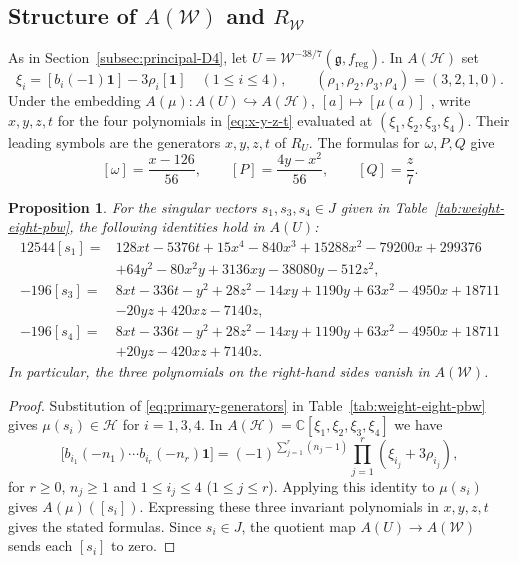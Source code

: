 \documentclass[11pt]{amsart}
\numberwithin{equation}{section}
\newtheorem{proposition}[theorem]{Proposition}
\theoremstyle{definition}
\theoremstyle{remark}
\newcommand{\CC}{\mathbb C}
\newcommand{\g}{\mathfrak g}
\newcommand{\one}{\mathbf1}
\newcommand{\W}{\mathcal W}
\newcommand{\reg}{\mathrm{reg}}
\begin{document}
\subsection{\texorpdfstring{Structure of $A(\mathcal W)$ and $R_{\mathcal W}$}{Structure of A(W) and R(W)}}
\label{sec:Zhu-relations}

As in Section~\ref{subsec:principal-D4}, let $U=\W^{-38/7}(\g,f_{\reg})$.
In $A(\mathcal H)$ set
\[
 \xi_i=[b_i(-1)\one]-3\rho_i[\one]\quad(1\leq i\leq4),
 \qquad (\rho_1,\rho_2,\rho_3,\rho_4)=(3,2,1,0).
\]
Under the embedding $A(\mu):A(U)\hookrightarrow A(\mathcal H)$,
$[a]\mapsto[\mu(a)]$ \cite[Lemma~6.1]{ACL}, write $x,y,z,t$ for
the four polynomials in \eqref{eq:x-y-z-t} evaluated at
$(\xi_1,\xi_2,\xi_3,\xi_4)$. Their leading symbols are the generators
$x,y,z,t$ of $R_U$. The formulas for $\omega,P,Q$ give
\[
 [\omega]=\frac{x-126}{56},\qquad [P]=\frac{4y-x^2}{56},\qquad [Q]=\frac z7.
\]


	
\begin{proposition}\label{prop:classes-singular-vectors}
For the singular vectors $s_1,s_3,s_4\in J$ given in
Table~\ref{tab:weight-eight-pbw}, the following identities hold in $A(U)$:
	\begin{align*}
		12544[s_1]={}&128xt-5376t+15x^4-840x^3
		+15288x^2-79200x+299376\\
		&+64y^2-80x^2y+3136xy-38080y-512z^2,\\[2mm]
		-196[s_3]={}&8xt-336t-y^2+28z^2-14xy
		+1190y+63x^2-4950x+18711\\
		&-20yz+420xz-7140z,\\[2mm]
		-196[s_4]={}&8xt-336t-y^2+28z^2-14xy
		+1190y+63x^2-4950x+18711\\
		&+20yz-420xz+7140z.
	\end{align*}
	In particular, the three polynomials on the right-hand sides vanish
	in $A(\mathcal W)$.
\end{proposition}	
	
\begin{proof}
Substitution of \eqref{eq:primary-generators} in Table~\ref{tab:weight-eight-pbw}
gives $\mu(s_i)\in\mathcal H$ for $i=1,3,4$. In
$A(\mathcal H)=\CC[\xi_1,\xi_2,\xi_3,\xi_4]$ we have
	\[
	\bigl[
	b_{i_1}(-n_1)\cdots b_{i_r}(-n_r)\mathbf1
	\bigr]
	=
	(-1)^{\sum_{j=1}^r(n_j-1)}
    \prod_{j=1}^r(\xi_{i_j}+3\rho_{i_j}),
	\]
for $r\geq0$, $n_j\geq1$ and $1\leq i_j\leq4$ ($1\leq j\leq r$).
Applying this identity to $\mu(s_i)$ gives $A(\mu)([s_i])$. Expressing
these three invariant polynomials in $x,y,z,t$ gives the stated
formulas. Since $s_i\in J$, the quotient map $A(U)\to A(\mathcal W)$
sends each $[s_i]$ to zero.
\end{proof}	
	
\end{document}
